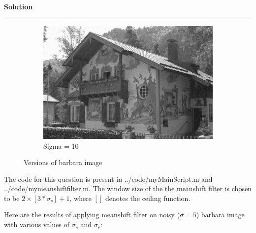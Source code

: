 \documentclass[a4paper]{article}
\newenvironment{solution}[2][]{%
    \begin{mdframed}[linecolor=green!60!black, linewidth=2pt, roundcorner=10pt, backgroundcolor=green!5!white, skipabove=12pt, skipbelow=12pt]%
        \textbf{\large #2} %
        \par\noindent\rule{\textwidth}{0.4pt} %
        \vspace{0.5em} %
}{%
    \end{mdframed}%
}
\begin{document}
\begin{solution}{Solution}
\begin{figure}[H]
    \begin{subfigure}[b]{0.3\textwidth}
        \centering
        \includegraphics[width=\textwidth]{../images/noisy_kodak24_sigma_10.png}
        \caption{Sigma = 10}
        \label{fig:subfig2}
    \end{subfigure}
    \caption{Versions of barbara image}
    \label{fig:overall}
\end{figure}

The code for this question is present in {../code/myMainScript.m} and {../code/mymeanshiftfilter.m}. The window size of the the meanshift filter is chosen to be $2\times [3*\sigma_s] + 1$, where $[]$ denotes the ceiling function.


Here are the results of applying meanshift filter on noisy ($\sigma = 5$) barbara image with various values of $\sigma_s$ and $\sigma_r$:


\end{solution}
\end{document}
